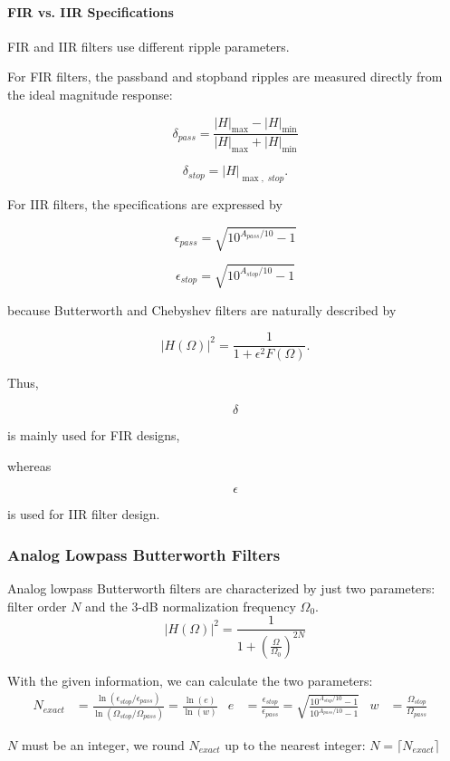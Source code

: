 \paragraph{FIR vs. IIR Specifications}

FIR and IIR filters use different ripple parameters.

For FIR filters, the passband and stopband ripples are measured directly
from the ideal magnitude response:

\[
\delta_{pass}
=
\frac{|H|_{\max}-|H|_{\min}}
{|H|_{\max}+|H|_{\min}}
\]

\[
\delta_{stop}
=
|H|_{\max,\;stop}.
\]

For IIR filters, the specifications are expressed by

\[
\epsilon_{pass}
=
\sqrt{10^{A_{pass}/10}-1}
\]

\[
\epsilon_{stop}
=
\sqrt{10^{A_{stop}/10}-1}
\]

because Butterworth and Chebyshev filters are naturally described by

\[
|H(\Omega)|^2
=
\frac1{1+\epsilon^2F(\Omega)}.
\]

Thus,

\[
\delta
\]

is mainly used for FIR designs,

whereas

\[
\epsilon
\]

is used for IIR filter design.

\subsubsection{Analog Lowpass Butterworth Filters}
Analog lowpass Butterworth filters are characterized by just two parameters:
filter order $N$ and the 3-dB normalization frequency $\Omega_0$.
\[
	\left|H(\Omega)\right|^2 =
		\frac{1}{1 + \left(\frac{\Omega}{\Omega_0}\right)^{2N}}
\]

With the given information, we can calculate the two parameters:
\begin{align*}
	N_{exact} &= \frac{
			\ln(\epsilon_{stop} / \epsilon_{pass})
		}{
			\ln(\Omega_{stop} / \Omega_{pass})
		}
	= \frac{\ln(e)}{\ln(w)} &
	e &= \frac{\epsilon_{stop}}{\epsilon_{pass}}
	   = \sqrt{\frac{10^{A_{stop}/10} -1}{10^{A_{pass}/10} -1}}&
	w &= \frac{\Omega_{stop}}{\Omega_{pass}}&
\end{align*}

$N$ must be an integer, we round $N_{exact}$ up to the nearest integer: $N = \lceil N_{exact} \rceil$

